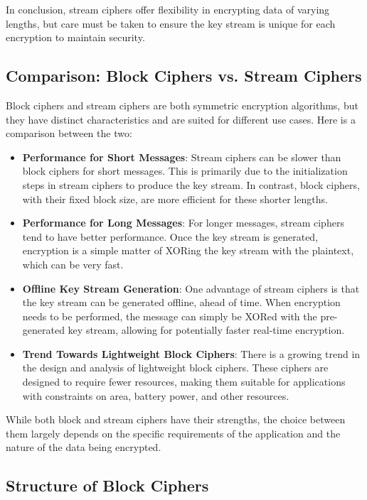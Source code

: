 \documentclass[12pt]{article}
\begin{document}
In conclusion, stream ciphers offer flexibility in encrypting data of varying lengths, but care must be taken to ensure the key stream is unique for each encryption to maintain security.


\subsection*{Comparison: Block Ciphers vs. Stream Ciphers}

Block ciphers and stream ciphers are both symmetric encryption algorithms, but they have distinct characteristics and are suited for different use cases. Here is a comparison between the two:

\begin{itemize}
    \item \textbf{Performance for Short Messages}: Stream ciphers can be slower than block ciphers for short messages. This is primarily due to the initialization steps in stream ciphers to produce the key stream. In contrast, block ciphers, with their fixed block size, are more efficient for these shorter lengths.
    
    \item \textbf{Performance for Long Messages}: For longer messages, stream ciphers tend to have better performance. Once the key stream is generated, encryption is a simple matter of XORing the key stream with the plaintext, which can be very fast.

    \item \textbf{Offline Key Stream Generation}: One advantage of stream ciphers is that the key stream can be generated offline, ahead of time. When encryption needs to be performed, the message can simply be XORed with the pre-generated key stream, allowing for potentially faster real-time encryption.

    \item \textbf{Trend Towards Lightweight Block Ciphers}: There is a growing trend in the design and analysis of lightweight block ciphers. These ciphers are designed to require fewer resources, making them suitable for applications with constraints on area, battery power, and other resources.
\end{itemize}

While both block and stream ciphers have their strengths, the choice between them largely depends on the specific requirements of the application and the nature of the data being encrypted.


\subsection*{Structure of Block Ciphers}
\end{document}
